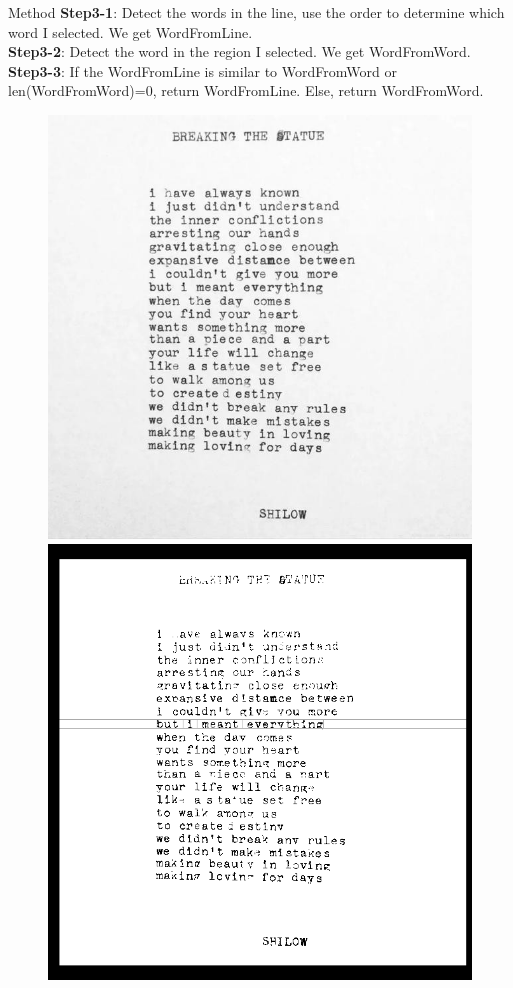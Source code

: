 \documentclass{beamer}
\begin{document}
\begin{frame}{Method}
		\textbf{Step3-1}: Detect the words in the line, use the order to determine which word I selected. We get WordFromLine.\\
		\textbf{Step3-2}: Detect the word in the region I selected. We get WordFromWord.\\
		\textbf{Step3-3}: If the WordFromLine is similar to WordFromWord or len(WordFromWord)=0, return WordFromLine. Else, return WordFromWord.\\
		\begin{figure}[h]
			\centering
			\includegraphics[height=0.4\linewidth]{./img1.jpg}
			\includegraphics[width = 0.4\linewidth]{./raw_done.png}
		\end{figure}
\end{frame}
\end{document}
